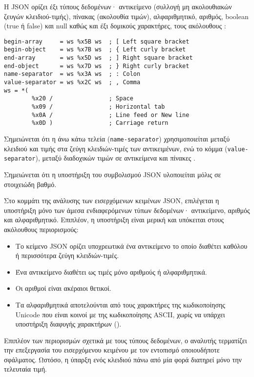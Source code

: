 Η JSON ορίζει έξι τύπους δεδομένων· αντικείμενο (συλλογή μη ακολουθιακών ζευγών
κλειδιού-τιμής), πίνακας (ακολουθία τιμών), αλφαριθμητικό, αριθμός, boolean
(true ή false) και null καθώς και έξι δομικούς χαρακτήρες, τους ακόλουθους
\parencite[3--5]{rfc7159}:
\begin{lstlisting}
begin-array     = ws %x5B ws  ; [ Left square bracket
begin-object    = ws %x7B ws  ; { Left curly bracket
end-array       = ws %x5D ws  ; ] Right square bracket
end-object      = ws %x7D ws  ; } Right curly bracket
name-separator  = ws %x3A ws  ; : Colon
value-separator = ws %x2C ws  ; , Comma
ws = *(
        %x20 /                ; Space
        %x09 /                ; Horizontal tab
        %x0A /                ; Line feed or New line
        %x0D )                ; Carriage return
\end{lstlisting}
Σημειώνεται ότι η άνω κάτω τελεία (\verb~name-separator~) χρησιμοποιείται μεταξύ
κλειδιού και τιμής στα ζεύγη κλειδιών-τιμές των αντικειμένων, ενώ το κόμμα
(\verb~value-separator~), μεταξύ διαδοχικών τιμών σε αντικείμενα και πίνακες
\parencite[6]{rfc7159}.


Σημειώνεται ότι η υποστήριξη του συμβολισμού JSON υλοποιείται μόλις σε
στοιχειώδη βαθμό.

Στο κομμάτι της ανάλυσης των εισερχόμενων κειμένων JSON, επιλέγεται η υποστήριξη
μόνο των άμεσα ενδιαφερόμενων τύπων δεδομένων· αντικείμενο, αριθμός και
αλφαριθμητικό. Επιπλέον, η υποστήριξη είναι μερική και υπόκειται στους
ακόλουθους περιορισμούς:
\begin{itemize}
    \item  Το κείμενο JSON ορίζει υποχρεωτικά ένα αντικείμενο το οποίο διαθέτει
    καθόλου ή περισσότερα ζεύγη κλειδιών-τιμές.

    \item Ένα αντικείμενο διαθέτει ως τιμές μόνο αριθμούς ή αλφαριθμητικά.

    \item Οι αριθμοί είναι ακέραιοι θετικοί.

    \item Τα αλφαριθμητικά αποτελούνται από τους χαρακτήρες της κωδικοποίησης
    Unicode που είναι κοινοί με της κωδικοποίησης ASCII, χωρίς να υπάρχει
    υποστήριξη διαφυγής χαρακτήρων ().
\end{itemize}

Επιπλέον των περιορισμών σχετικά με τους τύπους δεδομένων, ο αναλυτής τερματίζει
την επεξεργασία του εισερχόμενου κειμένου με τον εντοπισμό οποιουδήποτε
σφάλματος. Ωστόσο, η ύπαρξη ενός κλειδιού πάνω από μία φορά διατηρεί μόνο την
τελευταία τιμή.

